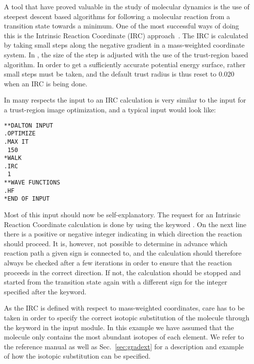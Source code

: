 A tool that have proved valuable in the study of molecular
dynamics
is the use of steepest descent based algorithms
for following a molecular reaction from a transition
state towards a minimum. One of the
most successful ways of doing this is the Intrinsic Reaction Coordinate (IRC)
approach~\cite{kfacr14,pmjcp88}. The IRC is calculated by taking small steps along the
negative gradient in a mass-weighted coordinate system. In \siraba , the
size of the step is adjusted with the use of the trust-region based
algorithm. In order to get a sufficiently accurate potential energy surface,
rather small steps must be taken, and the default trust radius is thus reset
to 0.020 when an IRC is being done.

In many respects the input to an IRC calculation is very similar to
the input for a trust-region image optimization,
and a typical input would look like:

\begin{verbatim}
**DALTON INPUT
.OPTIMIZE
.MAX IT
 150
*WALK
.IRC
 1
**WAVE FUNCTIONS
.HF
*END OF INPUT
\end{verbatim}

Most of this input should now be self-explanatory. The request for an
Intrinsic Reaction Coordinate calculation is done by using the keyword
. On the next line there is a positive or negative integer
indicating in which direction the reaction should proceed. It is,
however, not possible to determine in advance which reaction path a
given sign is connected to, and the calculation should therefore
always be checked after a few iterations in order to ensure that the
reaction proceeds in the correct direction. If not, the calculation
should be stopped and started from the transition state again with a
different sign for the integer specified after the  keyword.

As the IRC is defined with respect to mass-weighted
coordinates, care
has to be taken in order to specify the correct isotopic substitution
of the molecule through the keyword  in the
 input module. In this example we have assumed that the
molecule only contains the most abundant isotopes of each element. We
refer to the reference manual as well as Sec.~\ref{sec:gradext} for a
description and example of how the isotopic substitution can be specified.

